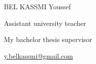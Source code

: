 \begin{Parallel}[v]{0.48\textwidth}{0.48\textwidth}
{\begin{cvhonors}
            \cvhonor
        {BEL KASSMI Youssef} %
            {
      \begin{cvitems} %
        \item {}
      \item {Assistant university teacher}
        \item {My bachelor thesis supervisor}
        \item { \href{mailto:y.belkassmi@gmail.com}{ y.belkassmi@gmail.com \faEnvelope} }
      \end{cvitems}}
   { }
    {} %
    

\end{cvhonors}
}
\ParallelPar
\end{Parallel}
